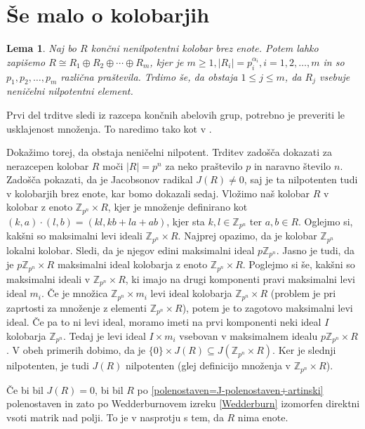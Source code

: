 \documentclass[a4paper, 12pt]{amsart}
\theoremstyle{definition} %
\theoremstyle{plain} %
\newtheorem{lema}[definicija]{Lema}
\newcommand{\Z}{\mathbb Z}
\begin{document}
\section{Še malo o kolobarjih}

\begin{lema}
\label{nilpotent}
Naj bo $R$ končni nenilpotentni kolobar brez enote. Potem lahko zapišemo $R\cong R_1 \oplus R_2 \oplus \cdots \oplus R_m$, kjer je $m \ge 1, |R_i| = p_i^{\alpha_i}, i=1, 2, \dots, m$ in so $p_1,p_2,\dots,p_m$ različna praštevila. Trdimo še, da obstaja $1 \le j \le m$, da $R_j$ vsebuje neničelni nilpotentni element.
\end{lema}

\proof
Prvi del trditve sledi iz razcepa končnih abelovih grup, potrebno je preveriti le usklajenost množenja. To naredimo tako kot v  \cite[Lema 2.3]{diploma}. 

Dokažimo torej, da obstaja neničelni nilpotent. Trditev zadošča dokazati za nerazcepen kolobar $R$ moči $|R|=p^n$ za neko praštevilo $p$ in naravno število $n$. Zadošča pokazati, da je Jacobsonov radikal $J(R)\neq 0$, saj je ta nilpotenten tudi v kolobarjih brez enote, kar bomo dokazali sedaj. Vložimo naš kolobar $R$ v kolobar z enoto $\Z_{p^n} \times R$, kjer je množenje definirano kot $(k,a)\cdot (l,b) = (kl,kb+la+ab)$, kjer sta $k,l\in \Z_{p^n}$ ter $a,b\in R$. Oglejmo si, kakšni so maksimalni levi ideali $\Z_{p^n} \times R$. Najprej opazimo, da je kolobar $\Z_{p^n}$ lokalni kolobar. Sledi, da je njegov edini maksimalni ideal $p\Z_{p^n}$. Jasno je tudi, da je $p\Z_{p^n}\times R$ maksimalni ideal kolobarja z enoto $\Z_{p^n} \times R$. 
Poglejmo si še, kakšni so maksimalni ideali v $\Z_{p^n} \times R$, ki imajo na drugi komponenti pravi maksimalni levi ideal $m_i$. Če je množica $\Z_{p^n} \times m_i$ levi ideal kolobarja $\Z_{p^n} \times R$ (problem je pri zaprtosti za množenje z elementi $\Z_{p^n} \times R$), potem je to zagotovo maksimalni levi ideal. Če pa to ni levi ideal, moramo imeti na prvi komponenti neki ideal $I$ kolobarja $\Z_{p^n}$. Tedaj  je levi ideal $I\times m_i$ vsebovan v maksimalnem idealu $p\Z_{p^n} \times R$. V obeh primerih dobimo, da je $\{0\}\times J(R) \subseteq J(\Z_{p^n}\times R)$. Ker je slednji nilpotenten, je tudi $J(R)$ nilpotenten (glej definicijo množenja v $\Z_{p^n}\times R$).

Če bi bil $J(R) = 0$, bi bil $R$ po \ref{polenostaven=J-polenostaven+artinski}  polenostaven in zato po Wedderburnovem izreku \ref{Wedderburn} izomorfen direktni vsoti matrik nad polji. To  je v nasprotju s tem, da $R$ nima enote.
\endproof		
\end{document}

